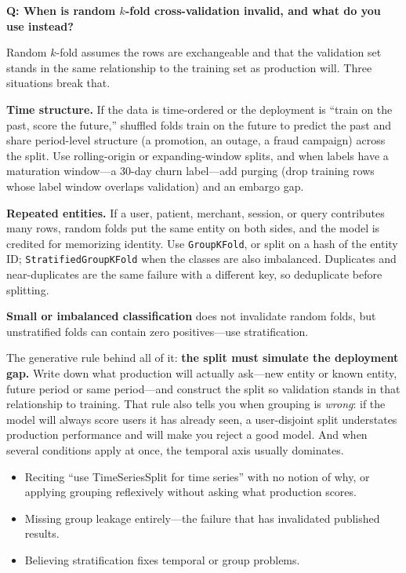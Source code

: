 \begin{interviewq}
\textbf{Q: When is random $k$-fold cross-validation invalid, and what do you use instead?}

 \quad {} \quad \badgefreq{\freqhigh}

\stronganswer

Random $k$-fold assumes the rows are exchangeable and that the validation set stands in the same relationship to the training set as production will. Three situations break that.

\textbf{Time structure.} If the data is time-ordered or the deployment is ``train on the past, score the future,'' shuffled folds train on the future to predict the past and share period-level structure (a promotion, an outage, a fraud campaign) across the split. Use rolling-origin or expanding-window splits, and when labels have a maturation window---a 30-day churn label---add purging (drop training rows whose label window overlaps validation) and an embargo gap.

\textbf{Repeated entities.} If a user, patient, merchant, session, or query contributes many rows, random folds put the same entity on both sides, and the model is credited for memorizing identity. Use \texttt{GroupKFold}, or split on a hash of the entity ID; \texttt{StratifiedGroupKFold} when the classes are also imbalanced. Duplicates and near-duplicates are the same failure with a different key, so deduplicate before splitting.

\textbf{Small or imbalanced classification} does not invalidate random folds, but unstratified folds can contain zero positives---use stratification.

The generative rule behind all of it: \textbf{the split must simulate the deployment gap.} Write down what production will actually ask---new entity or known entity, future period or same period---and construct the split so validation stands in that relationship to training. That rule also tells you when grouping is \emph{wrong}: if the model will always score users it has already seen, a user-disjoint split understates production performance and will make you reject a good model. And when several conditions apply at once, the temporal axis usually dominates.

\redflags
\begin{itemize}
    \item Reciting ``use TimeSeriesSplit for time series'' with no notion of why, or applying grouping reflexively without asking what production scores.
    \item Missing group leakage entirely---the failure that has invalidated published results.
    \item Believing stratification fixes temporal or group problems.
\end{itemize}


\end{interviewq}
